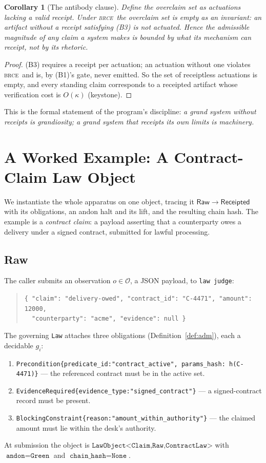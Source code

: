 \documentclass[11pt,oneside]{book}
\theoremstyle{definition}
\theoremstyle{plain}
\newtheorem{corollary}[theorem]{Corollary}
\theoremstyle{remark}
\newcommand{\Obs}{\mathcal{O}}                 %
\newcommand{\CL}{\kappa}                       %
\newcommand{\Raw}{\mathsf{Raw}}
\newcommand{\Rcpt}{\mathsf{Receipted}}
\newcommand{\BRCE}{\textsc{brce}}
\newcommand{\code}[1]{\texttt{#1}}
\begin{document}
\begin{corollary}[The antibody clause]\label{cor:antibody}
Define the \emph{overclaim set} as actuations lacking a valid receipt. Under \BRCE\ the
overclaim set is empty as an invariant: an artifact without a receipt satisfying (B3) is not
actuated. Hence the admissible magnitude of any claim a system makes is bounded by what its
mechanism can receipt, not by its rhetoric.
\end{corollary}

\begin{proof}
(B3) requires a receipt per actuation; an actuation without one violates \BRCE\ and is,
by (B1)'s gate, never emitted. So the set of receiptless actuations is empty, and every
standing claim corresponds to a receipted artifact whose verification cost is $O(\CL)$
(keystone). \end{proof}

This is the formal statement of the program's discipline: \emph{a grand system without
receipts is grandiosity; a grand system that receipts its own limits is machinery.}

\chapter{A Worked Example: A Contract-Claim Law Object}
\label{ch:example}

We instantiate the whole apparatus on one object, tracing it $\Raw\to\Rcpt$ with its
obligations, an andon halt and its lift, and the resulting chain hash. The example is a
\emph{contract claim}: a payload asserting that a counterparty owes a delivery under a signed
contract, submitted for lawful processing.

\section{Raw}

The caller submits an observation $o\in\Obs$, a JSON payload, to \code{law judge}:
\begin{quote}\small
\code{\{ "claim": "delivery-owed", "contract\_id": "C-4471", "amount": 12000,}\\
\code{\ \ "counterparty": "acme", "evidence": null \}}
\end{quote}
The governing \code{Law} attaches three obligations (Definition~\ref{def:adm}), each a
decidable $g_i$:
\begin{enumerate}[label=$g_{\arabic*}$:,leftmargin=*]
  \item \code{Precondition\{predicate\_id:"contract\_active", params\_hash: h(C-4471)\}}
        --- the referenced contract must be in the active set.
  \item \code{EvidenceRequired\{evidence\_type:"signed\_contract"\}} --- a signed-contract
        record must be present.
  \item \code{BlockingConstraint\{reason:"amount\_within\_authority"\}} --- the claimed
        amount must lie within the desk's authority.
\end{enumerate}
At submission the object is $\code{LawObject<Claim,Raw,ContractLaw>}$ with
$\code{andon}=\code{Green}$ and $\code{chain\_hash}=\code{None}$.
\end{document}
